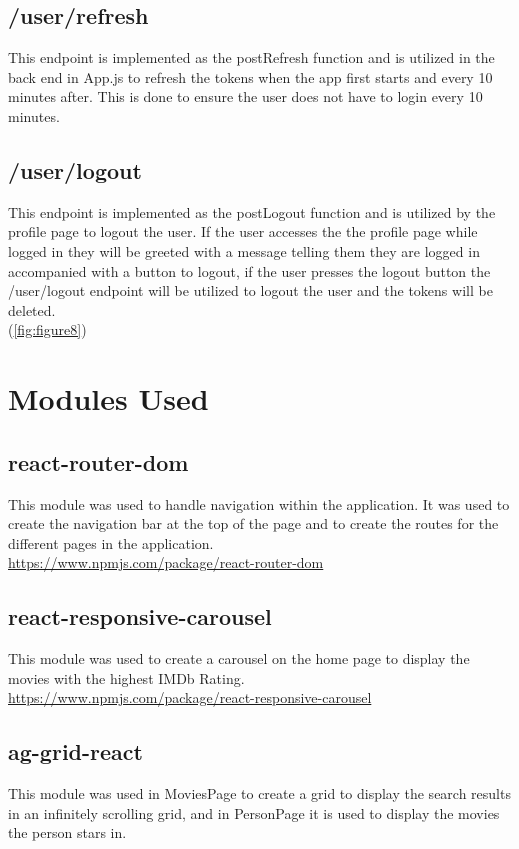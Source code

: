 \documentclass[12pt,a4paper]{article}
\begin{document}
		\subsection{/user/refresh}
			This endpoint is implemented as the postRefresh function and is utilized in the back end 
			in App.js to refresh the tokens when the app first starts and every 10 minutes after. 
			This is done to ensure the user does not have to login every 10 minutes.
		
		\subsection{/user/logout}
			This endpoint is implemented as the postLogout function and is utilized by the profile 
			page to logout the user. If the user accesses the the profile page while logged in they 
			will be greeted with a message telling them they are logged in accompanied with a button 
			to logout, if the user presses the logout button the /user/logout endpoint will be utilized 
			to logout the user and the tokens will be deleted.\\
			(\cref{fig:figure8})

	\section{Modules Used}
		\subsection{react-router-dom}
			This module was used to handle navigation within the application. It was used to create 
			the navigation bar at the top of the page and to create the routes for the different 
			pages in the application.\\

			\href{https://www.npmjs.com/package/react-router-dom}{https://www.npmjs.com/package/react-router-dom}
		
		\subsection{react-responsive-carousel}
			This module was used to create a carousel on the home page to display the movies with the 
			highest IMDb Rating.\\

			\href{https://www.npmjs.com/package/react-responsive-carousel}{https://www.npmjs.com/package/react-responsive-carousel}
		
		\subsection{ag-grid-react}
			This module was used in MoviesPage to create a grid to display the search results in an infinitely 
			scrolling grid, and in PersonPage it is used to display the movies the person stars in.\\
\end{document}
